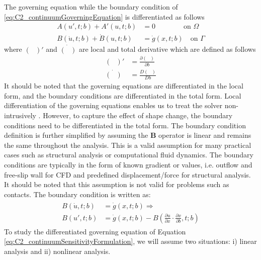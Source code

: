 The governing equation while the boundary condition of \eqref{eq:C2_continuumGoverningEquation} is differentiated as follows
%
\begin{subequations}\label{eq:C2_continuumSensitivityFormulation}
\begin{align}
    A(u', t; b) + A'(u, t; b) &= 0 \qquad \qquad \text{on } \Omega \\
    B(\dot{u}, t; b) + \dot{B}(u, t; b) &= \dot{g}(x, t; b) \quad \text{on } \Gamma
\end{align}    
\end{subequations}
%
where $(\text{ })'$ and $\dot{(\text{ })}$ are local and total derivative which are defined as follows
%
\begin{subequations}
\begin{align*}
    (\text{ })' &= \frac{\partial (\text{ })}{\partial b} \\
    \dot{(\text{ })} &= \frac{D (\text{ })}{D b}
\end{align*}
\end{subequations}
%
It should be noted that the governing equations are differentiated in the local form, and the boundary conditions are differentiated in the total form. Local differentiation of the governing equations enables us to treat the solver non-intrusively \cite{cross2014local}. However, to capture the effect of shape change, the boundary conditions need to be differentiated in the total form. The boundary condition definition is further simplified by assuming the $\mathbf{B}$ operator is linear and remains the same throughout the analysis. This is a valid assumption for many practical cases such as structural analysis or computational fluid dynamics. The boundary conditions are typically in the form of known gradient or values, i.e. outflow and free-slip wall for CFD and predefined displacement/force for structural analysis. It should be noted that this assumption is not valid for problems such as contacts. The boundary condition is written as:
%
\begin{align}\label{eq:C2_linearSAboundaryCondtions}
\begin{split}
    B(\dot{u}, t; b) &= \dot{g}(x, t; b) \Rightarrow \\
    B(u', t; b) &= \dot{g}(x, t; b) - B(\frac{\partial u}{\partial x} \cdot \frac{\partial x}{\partial b}, t; b)
\end{split}
\end{align}
%
To study the differentiated governing equation of Equation \eqref{eq:C2_continuumSensitivityFormulation}, we will assume two situations: i) linear analysis and ii) nonlinear analysis.

